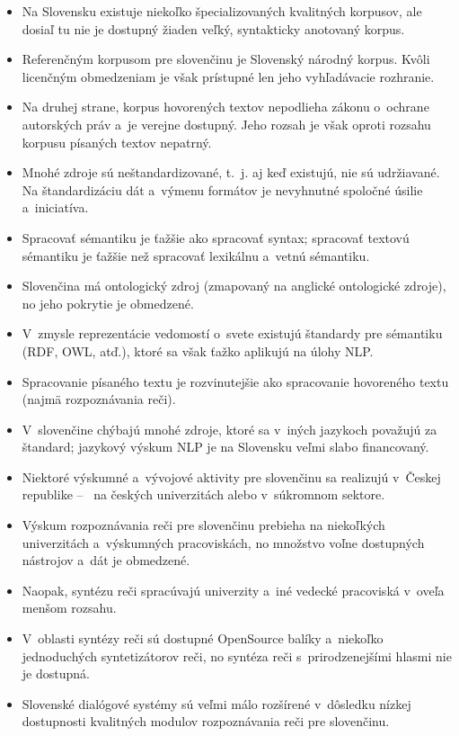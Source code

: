 \begin{multicols}{2}
\begin{itemize}
\item Na Slovensku existuje niekoľko špecializovaných kvalitných korpusov, ale dosiaľ tu nie je dostupný žiaden veľký, syntakticky anotovaný korpus.
\item Referenčným korpusom pre slovenčinu je Slovenský národný korpus. Kvôli licenčným obmedzeniam je však prístupné len jeho vyhľadávacie rozhranie.
\item Na druhej strane, korpus hovorených textov nepodlieha zákonu o~ochrane autorských práv a~je verejne dostupný. Jeho rozsah je však oproti rozsahu korpusu písaných textov nepatrný.
\item Mnohé zdroje sú neštandardizované, t.~j. aj keď existujú, nie sú udržiavané. Na štandardizáciu dát a~výmenu formátov je nevyhnutné spoločné úsilie a~iniciatíva.
\item Spracovať sémantiku je ťažšie ako spracovať syntax; spracovať textovú sémantiku je ťažšie než spracovať lexikálnu a~vetnú sémantiku.
\item Slovenčina má ontologický zdroj (zmapovaný na anglické ontologické zdroje), no jeho pokrytie je obmedzené.
\item V~zmysle reprezentácie vedomostí o~svete existujú štandardy pre sémantiku (RDF, OWL, atď.), ktoré sa však ťažko aplikujú na úlohy NLP.
\item Spracovanie písaného textu je rozvinutejšie ako spracovanie hovoreného textu (najmä rozpoznávania reči).
\item V~slovenčine chýbajú mnohé zdroje, ktoré sa v~iných jazykoch považujú za štandard; jazykový výskum NLP je na Slovensku veľmi slabo financovaný.
\item Niektoré výskumné a~vývojové aktivity pre slovenčinu sa realizujú v~Českej republike – ~na českých univerzitách alebo v~súkromnom sektore.
\item Výskum rozpoznávania reči pre slovenčinu prebieha na niekoľkých univerzitách a~výskumných pracoviskách, no množstvo voľne dostupných nástrojov a~dát je obmedzené.
\item Naopak, syntézu reči spracúvajú univerzity a~iné vedecké pracoviská v~oveľa menšom rozsahu.
\item V~oblasti syntézy reči sú dostupné OpenSource balíky a~niekoľko jednoduchých syntetizátorov reči, no syntéza reči s~prirodzenejšími hlasmi nie je dostupná.
\item Slovenské dialógové systémy sú veľmi málo rozšírené v~dôsledku nízkej dostupnosti kvalitných modulov rozpoznávania reči pre slovenčinu.
\end{itemize}


\end{multicols}
